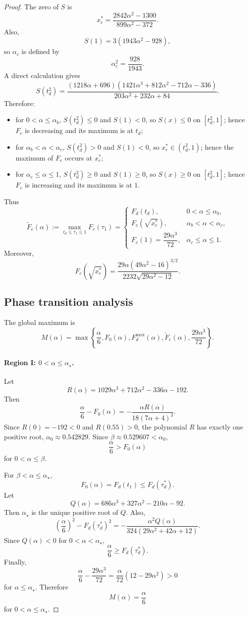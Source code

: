 \documentclass[11pt,reqno]{amsart}
\numberwithin{equation}{section}
\begin{document}
\begin{proof}
The zero of $S$ is
\[
x_e^*
=
\frac{2842\alpha^2-1300}{899\alpha^2-372}.
\]
Also,
\[
S(1)
=
3(1943\alpha^2-928),
\]
so $\alpha_c$ is defined by
\[
\alpha_c^2=\frac{928}{1943}.
\]
A direct calculation gives
\[
S(t_d^2)
=
\frac{
(1218\alpha+696)
(1421\alpha^3+812\alpha^2-712\alpha-336)
}
{203\alpha^2+232\alpha+84}.
\]
Therefore:
\begin{itemize}
\item for $0<\alpha\le\alpha_b$, $S(t_d^2)\le0$ and $S(1)<0$, so $S(x)\le0$ on $[t_d^2,1]$; hence $F_e$ is decreasing and its maximum is at $t_d$;
\item for $\alpha_b<\alpha<\alpha_c$, $S(t_d^2)>0$ and $S(1)<0$, so $x_e^*\in(t_d^2,1)$; hence the maximum of $F_e$ occurs at $x_e^*$;
\item for $\alpha_c\le\alpha\le1$, $S(t_d^2)\ge0$ and $S(1)\ge0$, so $S(x)\ge0$ on $[t_d^2,1]$; hence $F_e$ is increasing and its maximum is at $1$.
\end{itemize}
Thus
\[
\widetilde F_e(\alpha)
:=
\max_{t_d\le \tau_1\le1} F_e(\tau_1)
=
\begin{cases}
F_d(t_d), & 0<\alpha\le\alpha_b,\\[6pt]
F_e(\sqrt{x_e^*}), & \alpha_b<\alpha<\alpha_c,\\[6pt]
F_e(1)=\dfrac{29\alpha^3}{72}, & \alpha_c\le\alpha\le1.
\end{cases}
\]
Moreover,
\[
F_e(\sqrt{x_e^*})
=
\frac{29\alpha(49\alpha^2-16)^{3/2}}
{2232\sqrt{29\alpha^2-12}}.
\]

\subsection*{Phase transition analysis}

The global maximum is
\[
M(\alpha)
=
\max\left\{
\frac{\alpha}{6},
F_0(\alpha),
F_d^{\max}(\alpha),
\widetilde F_e(\alpha),
\frac{29\alpha^3}{72}
\right\}.
\]

\paragraph{Region I: $0<\alpha\le\alpha_\star$.}
Let
\[
R(\alpha)
=
1029\alpha^3+712\alpha^2-336\alpha-192.
\]
Then
\[
\frac{\alpha}{6}-F_0(\alpha)
=
-\frac{\alpha R(\alpha)}{18(7\alpha+4)^3}.
\]
Since $R(0)=-192<0$ and $R(0.55)>0$, the polynomial $R$ has exactly one positive root, $\alpha_0\approx 0.542829$. Since $\beta\approx 0.529607<\alpha_0$,
\[
\frac{\alpha}{6}>F_0(\alpha)
\]
for $0<\alpha\le\beta$.

For $\beta<\alpha\le\alpha_\star$,
\[
F_0(\alpha)=F_d(t_1)\le F_d(\tau_d^*).
\]
Let
\[
Q(\alpha)
=
686\alpha^3+327\alpha^2-210\alpha-92.
\]
Then $\alpha_\star$ is the unique positive root of $Q$. Also,
\[
\left(\frac{\alpha}{6}\right)^2
-
F_d(\tau_d^*)^2
=
-\frac{\alpha^2 Q(\alpha)}
{324(29\alpha^2+42\alpha+12)}.
\]
Since $Q(\alpha)<0$ for $0<\alpha<\alpha_\star$,
\[
\frac{\alpha}{6}\ge F_d(\tau_d^*).
\]
Finally,
\[
\frac{\alpha}{6}
-
\frac{29\alpha^3}{72}
=
\frac{\alpha}{72}(12-29\alpha^2)>0
\]
for $\alpha\le\alpha_\star$. Therefore
\[
M(\alpha)=\frac{\alpha}{6}
\]
for $0<\alpha\le\alpha_\star$.


\end{proof}
\end{document}
